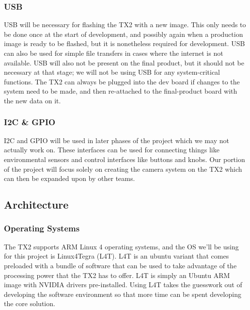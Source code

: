 \documentclass[letterpaper,10pt,serif,draftclsnofoot,onecolumn,compsoc,titlepage]{IEEEtran}
\begin{document}
\subsubsection{USB}

USB will be necessary for flashing the TX2 with a new image. This only needs to be 
done once at the start of development, and possibly again when a production image is 
ready to be flashed, but it is nonetheless required for development. USB can also be 
used for simple file transfers in cases where the internet is not available. USB will 
also not be present on the final product, but it should not be necessary at that stage; 
we will not be using USB for any system-critical functions. The TX2 can always be 
plugged into the dev board if changes to the system need to be made, and then 
re-attached to the final-product board with the new data on it.\\

\subsubsection{I2C \& GPIO}

I2C and GPIO will be used in later phases of the project which we may not actually 
work on. These interfaces can be used for connecting things like environmental sensors 
and control interfaces like buttons and knobs. Our portion of the project will focus 
solely on creating the camera system on the TX2 which can then be expanded upon by 
other teams. \\

\subsection{Architecture}

\subsubsection{Operating Systems}

The TX2 supports ARM Linux 4 operating systems, and the OS we’ll be using for this 
project is Linux4Tegra (L4T). L4T is an ubuntu variant that comes preloaded with a 
bundle of software that can be used to take advantage of the processing power that 
the TX2 has to offer. L4T is simply an Ubuntu ARM image with NVIDIA drivers 
pre-installed. Using L4T takes the guesswork out of developing the software 
environment so that more time can be spent developing the core solution. \\
\end{document}
